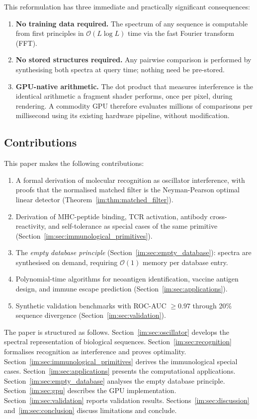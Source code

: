 This reformulation has three immediate and practically significant consequences:
\begin{enumerate}
  \item \textbf{No training data required.} The spectrum of any sequence is
    computable from first principles in $\mathcal{O}(L\log L)$ time via the
    fast Fourier transform (FFT).
  \item \textbf{No stored structures required.} Any pairwise comparison is
    performed by synthesising both spectra at query time; nothing need be
    pre-stored.
  \item \textbf{GPU-native arithmetic.} The dot product that measures
    interference is the identical arithmetic a fragment shader performs, once
    per pixel, during rendering. A commodity GPU therefore evaluates millions
    of comparisons per millisecond using its existing hardware pipeline, without
    modification.
\end{enumerate}

\subsection{Contributions}

This paper makes the following contributions:
\begin{enumerate}
  \item A formal derivation of molecular recognition as oscillator interference,
    with proofs that the normalised matched filter is the Neyman-Pearson optimal
    linear detector (Theorem~\ref{im:thm:matched_filter}).
  \item Derivation of MHC-peptide binding, TCR activation, antibody
    cross-reactivity, and self-tolerance as special cases of the same primitive
    (Section~\ref{im:sec:immunological_primitives}).
  \item The \emph{empty database principle}
    (Section~\ref{im:sec:empty_database}): spectra are synthesised on demand,
    requiring $\mathcal{O}(1)$ memory per database entry.
  \item Polynomial-time algorithms for neoantigen identification, vaccine
    antigen design, and immune escape prediction
    (Section~\ref{im:sec:applications}).
  \item Synthetic validation benchmarks with ROC-AUC $\geq 0.97$ through 20\%
    sequence divergence (Section~\ref{im:sec:validation}).
\end{enumerate}

The paper is structured as follows. Section~\ref{im:sec:oscillator} develops the
spectral representation of biological sequences.
Section~\ref{im:sec:recognition} formalises recognition as interference and proves
optimality. Section~\ref{im:sec:immunological_primitives} derives the immunological
special cases. Section~\ref{im:sec:applications} presents the computational
applications. Section~\ref{im:sec:empty_database} analyses the empty database
principle. Section~\ref{im:sec:gpu} describes the GPU implementation.
Section~\ref{im:sec:validation} reports validation results.
Sections~\ref{im:sec:discussion} and~\ref{im:sec:conclusion} discuss limitations and
conclude.


